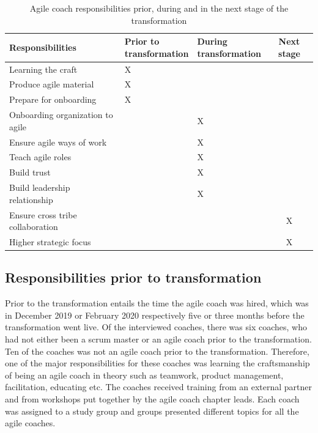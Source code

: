 \documentclass[11pt,a4paper]{report}
\begin{document}
\begin{table}[!ht]
    \centering
    \begin{tabular}{|l|p{2.7cm}|p{2.7cm}|c|} \hline
      \textbf{Responsibilities} & \makecell{\textbf{Prior to} \\ \textbf{transformation}}  & \makecell{ \textbf{During} \\ \textbf{transformation}  }  & \textbf{Next stage} \\ \hline
       Learning the craft & \centering X &  &  \\ \hline
       Produce agile material & \centering X &  &  \\ \hline
       Prepare for onboarding & \centering X &  &  \\ \hline
       Onboarding organization to agile &  & \centering X &  \\ \hline
       Ensure agile ways of work &  & \centering X &  \\ \hline
       Teach agile roles &  & \centering X &  \\ \hline
       Build trust &  & \centering X &  \\ \hline
       Build leadership relationship &  & \centering X &  \\ \hline
       Ensure cross tribe collaboration &  &  & X \\ \hline
       Higher strategic focus &  &  & X \\ \hline
    \end{tabular}
    \caption{Agile coach responsibilities prior, during and in the next stage of the transformation}
    \label{AC responsiblities table}
\end{table}

\subsection{Responsibilities prior to transformation}
Prior to the transformation entails the time the agile coach was hired, which was in December 2019 or February 2020 respectively five or three months before the transformation went live. Of the interviewed coaches, there was six coaches, who had not either been a scrum master or an agile coach prior to the transformation. Ten of the coaches was not an agile coach prior to the transformation. Therefore, one of the major responsibilities for these coaches was learning the craftsmanship of being an agile coach in theory such as teamwork, product management, facilitation, educating etc. The coaches received training from an external partner and from workshops put together by the agile coach chapter leads. Each coach was assigned to a study group and groups presented different topics for all the agile coaches.
\end{document}
